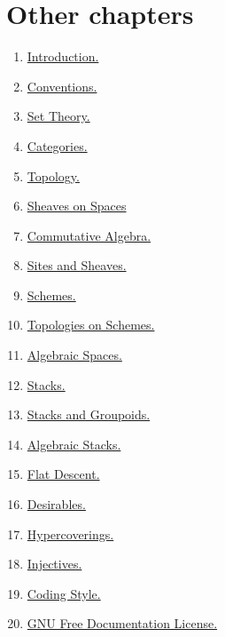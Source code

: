 \section{Other chapters}

\begin{multicols}{2}
\begin{enumerate}
\item \hyperref[introduction-section-overview]{Introduction.}
\item \hyperref[conventions-section-comments]{Conventions.}
\item \hyperref[sets-section-introduction]{Set Theory.}
\item \hyperref[categories-section-introduction]{Categories.}
\item \hyperref[topology-section-introduction]{Topology.}
\item \hyperref[sheaves-section-introduction]{Sheaves on Spaces}
\item \hyperref[algebra-section-introduction]{Commutative Algebra.}
\item \hyperref[sites-section-introduction]{Sites and Sheaves.}
\item \hyperref[schemes-section-introduction]{Schemes.}
\item \hyperref[etale-section-introduction]{Topologies on Schemes.}
\item \hyperref[spaces-section-introduction]{Algebraic Spaces.}
\item \hyperref[stacks-section-introduction]{Stacks.}
\item \hyperref[stacks-groupoids-section-introduction]{Stacks and Groupoids.}
\item \hyperref[algebraic-section-introduction]{Algebraic Stacks.}
\item \hyperref[flat-section-introduction]{Flat Descent.}
\item \hyperref[desirables-section-introduction]{Desirables.}
\item \hyperref[hypercovering-section-introduction]{Hypercoverings.}
\item \hyperref[injectives-section-introduction]{Injectives.}
\item \hyperref[coding-section-style]{Coding Style.}
\item \hyperref[fdl-version]{GNU Free Documentation License.}
\end{enumerate}
\end{multicols}
